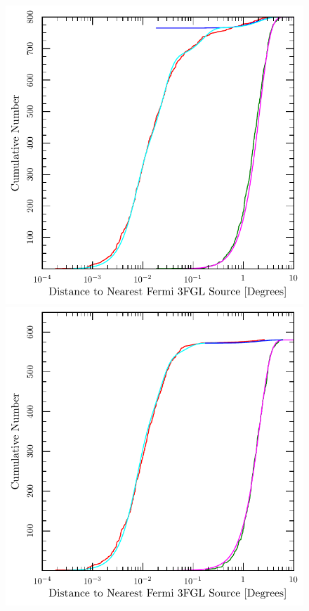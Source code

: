 \documentclass[useAMS,usenatbib]{mn2e}
\begin{document}
\begin{figure}
\includegraphics[width=\columnwidth]{cumff.pdf}
\includegraphics[width=\columnwidth]{cumff_hib.pdf}

\end{figure}
\end{document}
